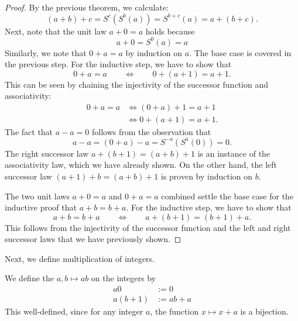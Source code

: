\begin{proof}
  By the previous theorem, we calculate:
  \begin{equation*}
    (a+b)+c= S^c(S^b(a))=S^{b+c}(a)=a+(b+c).
  \end{equation*}
  Next, note that the unit law $a+0=a$ holds because
  \begin{equation*}
    a+0=S^0(a)=a
  \end{equation*}
  Similarly, we note that $0+a=a$ by induction on $a$. The base case is covered in the previous step. For the inductive step, we have to show that
  \begin{equation*}
    0+a=a\qquad\Leftrightarrow\qquad 0+(a+1)=a+1.
  \end{equation*}
  This can be seen by chaining the injectivity of the successor function and associativity:
  \begin{align*}
    0+a=a & \Leftrightarrow (0+a)+1=a+1 \\
          & \Leftrightarrow 0+(a+1)=a+1.
  \end{align*}
  The fact that $a-a=0$ follows from the observation that
  \begin{equation*}
    a-a=(0+a)-a=S^{-a}(S^a(0))=0.
  \end{equation*}
  The right successor law $a+(b+1)=(a+b)+1$ is an instance of the associativity law, which we have already shown. On the other hand, the left successor law $(a+1)+b=(a+b)+1$ is proven by induction on $b$.
  
  The two unit laws $a+0=a$ and $0+a=a$ combined settle the base case for the inductive proof that $a+b=b+a$. For the inductive step, we have to show that
  \begin{equation*}
    a+b=b+a \qquad\Leftrightarrow\qquad a+(b+1)=(b+1)+a.
  \end{equation*}
  This follows from the injectivity of the successor function and the left and right successor laws that we have previously shown.
\end{proof}

Next, we define multiplication of integers.

\begin{definition}
  We define the  $a,b\mapsto ab$ on the integers by
  \begin{align*}
    a0 & := 0 \\
    a(b+1) & := ab+a
  \end{align*}
  This well-defined, since for any integer $a$, the function $x\mapsto x+a$ is a bijection.
\end{definition}

